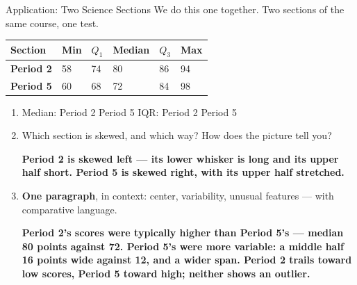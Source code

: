 \documentclass[12pt]{article}
\newcommand{\answerspace}[2]{\par\nopagebreak\noindent\begin{minipage}[t][#1][t]{\linewidth}%
  \color{keyred}\bfseries #2\end{minipage}\par}
\newcommand{\bxp}[7]{%
  \draw[thick, navy] (#3,#1) -- (#4,#1);
  \draw[thick, navy] (#6,#1) -- (#7,#1);
  \draw[thick, navy] (#3,{#1-#2}) -- (#3,{#1+#2});
  \draw[thick, navy] (#7,{#1-#2}) -- (#7,{#1+#2});
  \draw[thick, navy, fill=skymid] (#4,{#1-#2}) rectangle (#6,{#1+#2});
  \draw[very thick, navy] (#5,{#1-#2}) -- (#5,{#1+#2});}
\begin{document}
\boxguard[14]
\begin{notesbox}{Application: Two Science Sections}
We do this one together. Two sections of the same course, one test.

\vspace{2pt}
\begin{center}
\end{center}

\renewcommand{\arraystretch}{1.2}
\begin{center}
\begin{tabularx}{0.92\linewidth}{@{} l Y Y Y Y Y @{}}
\textbf{Section} & \textbf{Min} & \textbf{$Q_1$} & \textbf{Median} & \textbf{$Q_3$} &
\textbf{Max} \\
\hline
\textbf{Period 2} & 58 & 74 & 80 & 86 & 94 \\
\textbf{Period 5} & 60 & 68 & 72 & 84 & 98 \\
\end{tabularx}
\end{center}
\vspace{3pt}

\begin{enumerate}[label=\textbf{\alph*.}, leftmargin=1.8em, itemsep=4pt]
  \item Median: Period 2  \quad Period 5  \qquad
        IQR: Period 2  \quad Period 5 
  \item Which section is skewed, and which way? How does the picture tell you?
        \answerspace{1.6cm}{Period 2 is skewed left --- its lower whisker is long and its upper
        half short. Period 5 is skewed right, with its upper half stretched.}
  \item \textbf{One paragraph}, in context: center, variability, unusual features --- with
        comparative language.
        \answerspace{2.6cm}{Period 2's scores were typically higher than Period 5's --- median 80
        points against 72. Period 5's were more variable: a middle half 16 points wide against
        12, and a wider span. Period 2 trails toward low scores, Period 5 toward high; neither
        shows an outlier.}
\end{enumerate}
\end{notesbox}
\end{document}
